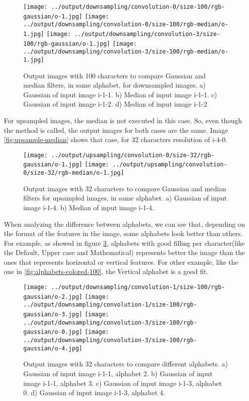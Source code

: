 \documentclass[]{IEEEtran}
\begin{document}
\begin{figure}[H]
    \centering
    \texttt{[image: ../output/downsampling/convolution-0/size-100/rgb-gaussian/o-1.jpg]}
    \texttt{[image: ../output/downsampling/convolution-0/size-100/rgb-median/o-1.jpg]}
    \texttt{[image: ../output/downsampling/convolution-3/size-100/rgb-gaussian/o-1.jpg]}
    \texttt{[image: ../output/downsampling/convolution-3/size-100/rgb-median/o-1.jpg]}
    \caption{Output images with 100 characters to compare Gaussian and median filters, in same alphabet, for downsampled images. a) Gaussian of input image i-1-1. b) Median of input image i-1-1. c) Gaussian of input image i-1-2. d) Median of input image i-1-2}
    \label{fig:colored-filters-100}
\end{figure}

For upsampled images, the median is not executed in this case. So, even though the method is called, the output images for both cases are the same. Image \ref{fig:upsample-median} shows that case, for 32 characters resolution of i-4-0.

\begin{figure}[H]
    \centering
    \texttt{[image: ../output/upsampling/convolution-0/size-32/rgb-gaussian/o-1.jpg]}
    \texttt{[image: ../output/upsampling/convolution-0/size-32/rgb-median/o-1.jpg]}
    \caption{Output images with 32 characters to compare Gaussian and median filters for upsampled images, in same alphabet. a) Gaussian of input image i-1-4. b) Median of input image i-1-4.}
    \label{fig:colored-filters-100}
\end{figure}

When analyzing the difference between alphabets, we can see that, depending on the format of the features in the image, some alphabets look better than others. For example, as showed in figure \ref{fig:alphabets-colored-32}, alphabets with good filling per character(like the Default, Upper case and Mathematical) represents better the image than the ones that represents horizontal or vertical features. For other example, like the one in \ref{fig:alphabets-colored-100}, the Vertical alphabet is a good fit. 

\begin{figure}[H]
    \centering
    \texttt{[image: ../output/downsampling/convolution-1/size-100/rgb-gaussian/o-2.jpg]}
    \texttt{[image: ../output/downsampling/convolution-1/size-100/rgb-gaussian/o-3.jpg]}
    \texttt{[image: ../output/downsampling/convolution-3/size-100/rgb-gaussian/o-0.jpg]}
    \texttt{[image: ../output/downsampling/convolution-3/size-100/rgb-gaussian/o-4.jpg]}
    \caption{Output images with 32 characters to compare different alphabets. a) Gaussian of input image i-1-1, alphabet 2. b) Gaussian of input image i-1-1, alphabet 3. c) Gaussian of input image i-1-3, alphabet 0. d) Gaussian of input image i-1-3, alphabet 4.}
    \label{fig:alphabets-colored-32}
\end{figure}
\end{document}

